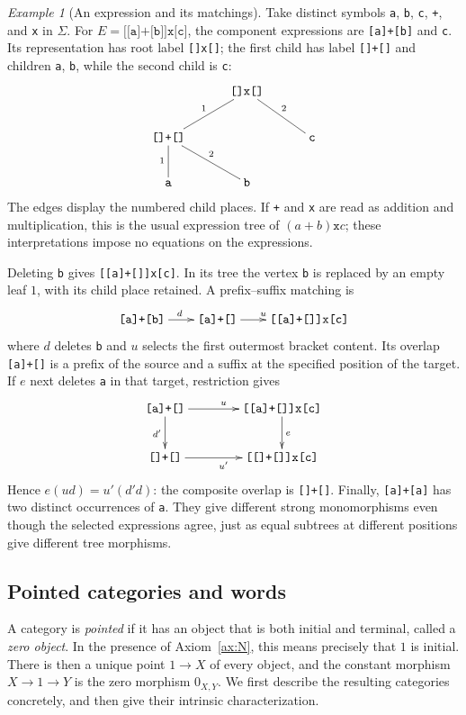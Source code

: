 \documentclass[11pt,a4paper]{article}
\theoremstyle{plain}
\theoremstyle{definition}
\theoremstyle{remark}
\newtheorem{example}[theorem]{Example}
\newcommand{\one}{1}
\begin{document}
\begin{example}[An expression and its matchings]\label{ex:bracketed-matchings}
Take distinct symbols \texttt{a}, \texttt{b}, \texttt{c}, \texttt{+},
and \texttt{x} in $\Sigma$. For
$E=\texttt{[[a]+[b]]x[c]}$, the component expressions are
\texttt{[a]+[b]} and \texttt{c}. Its representation has root label
\texttt{[]x[]}; the first child has label \texttt{[]+[]} and children
\texttt{a}, \texttt{b}, while the second child is \texttt{c}:
\[
 \xymatrix@C=3em@R=2.3em{
  & \texttt{[]x[]} \ar@{-}[dl]_{1} \ar@{-}[dr]^{2} & \\
  \texttt{[]+[]} \ar@{-}[d]_{1} \ar@{-}[dr]^{2} & & \texttt{c} \\
  \texttt{a} & \texttt{b} &
 }
\]
The edges display the numbered child places. If \texttt{+} and
\texttt{x} are read as addition and multiplication, this is the usual
expression tree of $(a+b)\mathbin{\texttt{x}}c$; these interpretations
impose no equations on the expressions.

Deleting \texttt{b} gives \texttt{[[a]+[]]x[c]}. In its tree the
vertex \texttt{b} is replaced by an empty leaf $1$, with its child
place retained. A prefix--suffix matching is
\[
 \xymatrix@C=2em{
  \texttt{[a]+[b]} \ar[r]^{d} &
  \texttt{[a]+[]} \ar[r]^{u} &
  \texttt{[[a]+[]]x[c]}
 }
\]
where $d$ deletes \texttt{b} and $u$ selects the first outermost
bracket content. Its overlap \texttt{[a]+[]} is a prefix of the source
and a suffix at the specified position of the target.
If $e$ next deletes \texttt{a} in that target, restriction gives
\[
 \xymatrix@C=4em@R=2.5em{
  \texttt{[a]+[]} \ar[r]^{u} \ar[d]_{d'} &
  \texttt{[[a]+[]]x[c]} \ar[d]^{e} \\
  \texttt{[]+[]} \ar[r]_{u'} &
  \texttt{[[]+[]]x[c]}
 }
\]
Hence $e(ud)=u'(d'd)$: the composite overlap is \texttt{[]+[]}.
Finally, \texttt{[a]+[a]} has two distinct occurrences of
\texttt{a}. They give different strong monomorphisms even though
the selected expressions agree, just as equal subtrees at different
positions give different tree morphisms.
\end{example}
\subsection{Pointed categories and words}\label{sec:words}
A category is \emph{pointed} if it has an object that is both initial
and terminal, called a \emph{zero object}. In the presence of
Axiom~\ref{ax:N}, this means precisely that $\one$ is initial.
There is then a unique point $\one\to X$ of every object, and the
constant morphism $X\to\one\to Y$ is the zero morphism $0_{X,Y}$.
We first describe the resulting categories concretely, and then
give their intrinsic characterization.
\end{document}
